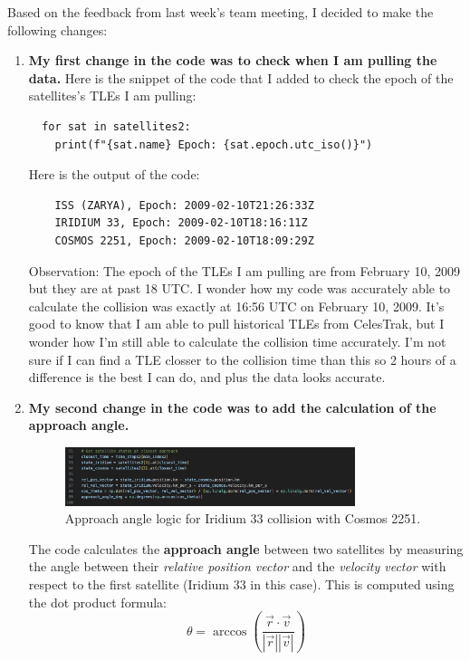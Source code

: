 \documentclass[12pt]{report}
\begin{document}
Based on the feedback from last week’s team meeting, I decided to make the following changes:

\begin{enumerate}
  \item \textbf{My first change in the code was to check when I am pulling the data.}
  Here is the snippet of the code that I added to check the epoch of the satellites's TLEs I am pulling:
  \begin{verbatim}
  for sat in satellites2:
    print(f"{sat.name} Epoch: {sat.epoch.utc_iso()}")
  \end{verbatim}

  Here is the output of the code:
  \begin{verbatim}
    ISS (ZARYA), Epoch: 2009-02-10T21:26:33Z
    IRIDIUM 33, Epoch: 2009-02-10T18:16:11Z
    COSMOS 2251, Epoch: 2009-02-10T18:09:29Z
  \end{verbatim}

  Observation: The epoch of the TLEs I am pulling are from February 10, 2009 but they are at past 18 UTC.
  I wonder how my code was accurately able to calculate the collision was exactly at 16:56 UTC on February 10, 2009.
  It's good to know that I am able to pull historical TLEs from CelesTrak, but I wonder how I'm still able to calculate the collision time accurately.
  I'm not sure if I can find a TLE closser to the collision time than this so 2 hours of a difference is the best I can do, and plus the data looks accurate.

  \item \textbf{My second change in the code was to add the calculation of the approach angle.}

  \begin{figure}[H]
    \centering
    \includegraphics[width=0.8\textwidth]{figure_week_4_angle-code.png}
    \caption{Approach angle logic for Iridium 33 collision with Cosmos 2251.}
    \label{fig:iridium_collision_approach_angle}
  \end{figure}

  The code calculates the \textbf{approach angle} between two satellites by measuring the angle between their \textit{relative position vector} and the \textit{velocity vector} with respect to the first satellite (Iridium 33 in this case).
  \newline\newline
  This is computed using the dot product formula:
  \begin{equation}
  \theta = \arccos\left(\frac{\vec{r} \cdot \vec{v}}{|\vec{r}| |\vec{v}|}\right)
  \end{equation}


\end{enumerate}
\end{document}
